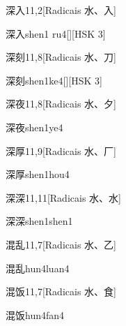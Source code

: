 \begin{entry}{深入}{11,2}[Radicais ⽔、⼊]
  \begin{phonetics}{深入}{shen1 ru4}[][HSK 3]
  \end{phonetics}
\end{entry}

\begin{entry}{深刻}{11,8}[Radicais ⽔、⼑]
  \begin{phonetics}{深刻}{shen1ke4}[][HSK 3]
  \end{phonetics}
\end{entry}

\begin{entry}{深夜}{11,8}[Radicais ⽔、⼣]
  \begin{phonetics}{深夜}{shen1ye4}
  \end{phonetics}
\end{entry}

\begin{entry}{深厚}{11,9}[Radicais ⽔、⼚]
  \begin{phonetics}{深厚}{shen1hou4}
  \end{phonetics}
\end{entry}

\begin{entry}{深深}{11,11}[Radicais ⽔、⽔]
  \begin{phonetics}{深深}{shen1shen1}
  \end{phonetics}
\end{entry}

\begin{entry}{混乱}{11,7}[Radicais ⽔、⼄]
  \begin{phonetics}{混乱}{hun4luan4}
  \end{phonetics}
\end{entry}

\begin{entry}{混饭}{11,7}[Radicais ⽔、⾷]
  \begin{phonetics}{混饭}{hun4fan4}
  \end{phonetics}
\end{entry}

